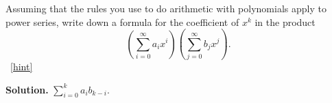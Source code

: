 \documentclass{book}
\begin{document}
\setcounter{project}{248}
\addtocounter{project}{-1}
\begin{activity}[]\label{coeffinpowerseries}
\hypertarget{p-1360}{}%
Assuming that the rules you use to do arithmetic with polynomials apply to power series, write down a formula for the coefficient of \(x^k\) in the product%
\begin{equation*}
\left(\sum_{i=0}^\infty a_ix^i\right)\left(\sum_{j=0}^\infty
b_jx^j\right)\text{.}
\end{equation*}
%
~\hfill{\tiny\hyperlink{a-248}{[hint]}\hypertarget{q-248}{}}\par\smallskip%
\noindent\textbf{Solution.}\hypertarget{solution-183}{}\quad%
\hypertarget{p-1362}{}%
\(\sum_{i=0}^k a_ib_{k-i}\).%
\end{activity}
\end{document}
